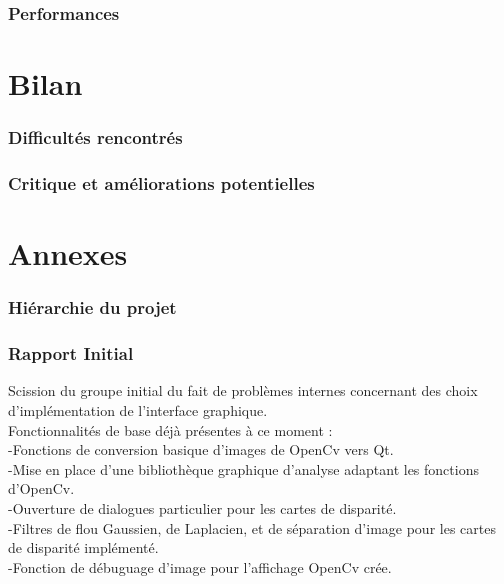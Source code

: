 \documentclass{article}
\begin{document}
\newpage
\section{Performances}


\newpage
\part{Bilan}

\newpage
\section{Difficultés rencontrés}

\newpage
\section{Critique et améliorations potentielles}

\newpage
\appendix
\part{Annexes}

\listoffigures

\newpage
\section{Hiérarchie du projet}



\newpage
\section{Rapport Initial}
Scission du groupe initial du fait de problèmes internes concernant des choix d'implémentation de l'interface graphique.\\

Fonctionnalités de base déjà présentes à ce moment :\\
	-Fonctions de conversion basique d'images de OpenCv vers Qt.\\
	-Mise en place d'une bibliothèque graphique d'analyse adaptant les fonctions d'OpenCv.\\
	-Ouverture de dialogues particulier pour les cartes de disparité.\\
	-Filtres de flou Gaussien, de Laplacien, et de séparation d'image pour les cartes de disparité implémenté.\\
	-Fonction de débuguage d'image pour l'affichage OpenCv crée.\\
\end{document}
